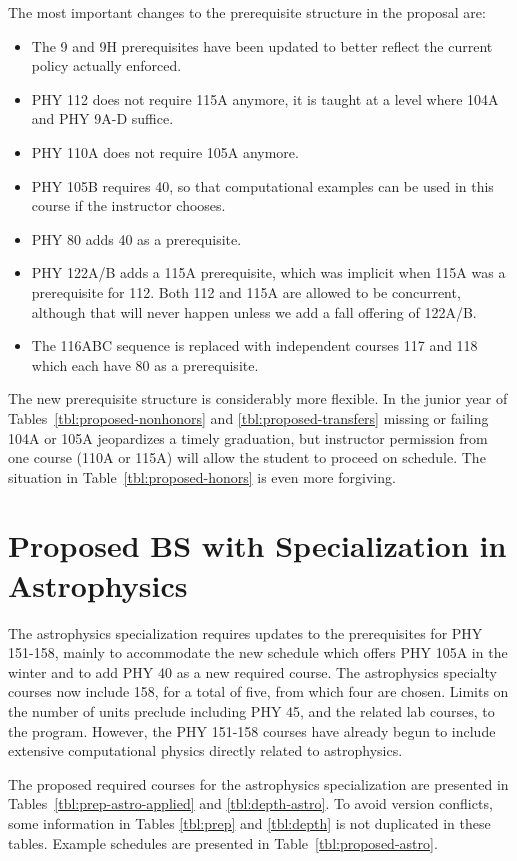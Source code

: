 \documentclass[12pt]{article}
\begin{document}
The most important changes to the prerequisite structure in the proposal are:
\begin{itemize}
\item The 9 and 9H prerequisites have been updated to better reflect the current policy actually enforced.
\item PHY 112 does not require 115A anymore, it is taught at a level where 104A and PHY 9A-D suffice.  
\item PHY 110A does not require 105A anymore. 
\item PHY 105B requires 40, so that computational examples can be used in this course if the instructor chooses.
\item PHY 80 adds 40 as a prerequisite.
\item PHY 122A/B adds a 115A prerequisite, which was implicit when
  115A was a prerequisite for 112.  Both 112 and 115A are allowed to
  be concurrent, although that will never happen unless we add a fall
  offering of 122A/B.
\item The 116ABC sequence is replaced with independent courses 117 and
  118 which each have 80 as a prerequisite.

\end{itemize}
The new prerequisite structure is considerably more flexible.  In the
junior year of Tables~\ref{tbl:proposed-nonhonors} and
\ref{tbl:proposed-transfers} missing or failing 104A or 105A
jeopardizes a timely graduation, but instructor permission from one
course (110A or 115A) will allow the student to proceed on schedule.
The situation in Table~\ref{tbl:proposed-honors} is even more
forgiving.

\newpage

\section{Proposed BS with Specialization in Astrophysics}
The astrophysics specialization requires updates to the prerequisites
for PHY 151-158, mainly to accommodate the new schedule which offers
PHY 105A in the winter and to add PHY 40 as a new required course.  The
astrophysics specialty courses now include 158, for a total of five,
from which four are chosen.  Limits on the number of units preclude
including PHY 45, and the related lab courses, to the program.
However, the PHY 151-158 courses have already begun to include
extensive computational physics directly related to astrophysics.

The proposed required courses for the astrophysics specialization are presented in
Tables~\ref{tbl:prep-astro-applied} and \ref{tbl:depth-astro}.  To avoid
version conflicts, some information in Tables \ref{tbl:prep} and
\ref{tbl:depth} is not duplicated in these tables.  Example schedules are presented
in Table~\ref{tbl:proposed-astro}.
\end{document}
